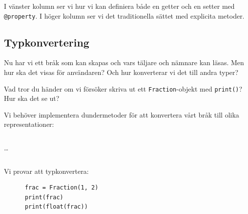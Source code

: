 I vänster kolumn ser vi hur vi kan definiera både en \foreignlanguage{english}{getter} 
och en \foreignlanguage{english}{setter} med \texttt{@property}. 
I höger kolumn ser vi det traditionella sättet med explicita metoder.


\subsection{Typkonvertering}


Nu har vi ett bråk som kan skapas och vars täljare och nämnare kan läsas. Men
hur ska det visas för användaren? Och hur konverterar vi det till andra typer?

\begin{exercise}
  Vad tror du händer om vi försöker skriva ut ett \texttt{Fraction}-objekt
  med \texttt{print()}? Hur ska det se ut?
\end{exercise}


Vi behöver implementera dundermetoder för att konvertera vårt bråk till 
olika representationer:

\begin{frame}[fragile]
  \inputminted[linenos,firstline=3,lastline=3]{python}{examples/myfrac_base.py}
  \dots
  \inputminted[linenos,autogobble=false,firstline=25,lastline=30]{python}{examples/myfrac_base.py}

  \begin{example}
    Vi provar att typkonvertera:
    \begin{verbatim}
      frac = Fraction(1, 2)
      print(frac)
      print(float(frac))
    \end{verbatim}
  \end{example}
\end{frame}

